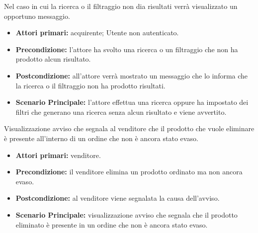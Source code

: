 
Nel caso in cui la ricerca o il filtraggio non dia risultati verrà visualizzato un opportuno messaggio.
\begin{itemize}
	\item \textbf{Attori primari:} acquirente; Utente non autenticato. 
	\item \textbf{Precondizione:} l'attore ha svolto una ricerca o un filtraggio che non ha prodotto alcun risultato.
	\item \textbf{Postcondizione:} all'attore verrà mostrato un messaggio che lo informa che la ricerca o il filtraggio non ha prodotto risultati.
	\item \textbf{Scenario Principale:} l'attore effettua una ricerca oppure ha impostato dei filtri che generano una ricerca senza alcun risultato e viene avvertito.
\end{itemize}

Visualizzazione avviso che segnala al venditore che il prodotto che vuole eliminare è presente all'interno di un ordine che non è ancora stato evaso.
\begin{itemize}
    \item \textbf{Attori primari:} venditore.
    \item \textbf{Precondizione:} il venditore elimina un prodotto ordinato ma non ancora evaso.
    \item \textbf{Postcondizione:} al venditore viene segnalata la causa dell'avviso.
    \item \textbf{Scenario Principale:} visualizzazione avviso che segnala che il prodotto eliminato è presente in un ordine che non è ancora stato evaso.
\end{itemize}

